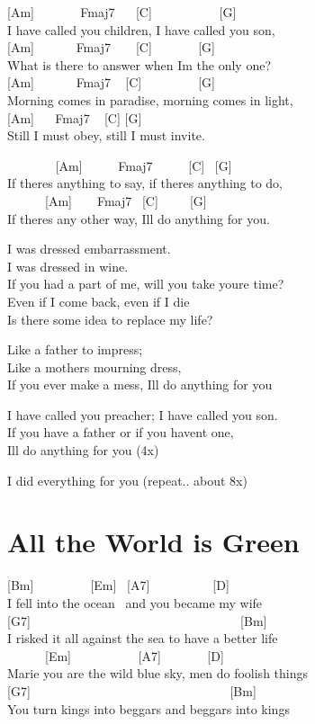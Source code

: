 \documentclass[
  letterpaper,
]{scrbook}
\begin{document}
{[}Am{]} ~ ~ ~ ~ Fmaj7 ~ ~{[}C{]} ~ ~ ~ ~ ~ ~ {[}G{]}\\
I have called you children, I have called you son,\\
{[}Am{]} ~ ~ ~ ~Fmaj7 ~ ~ {[}C{]} ~ ~ ~ ~ {[}G{]}\\
What is there to answer when I\textquotesingle m the only one?\\
{[}Am{]} ~ ~ ~ ~Fmaj7 ~ {[}C{]} ~ ~ ~ ~ ~ {[}G{]}\\
Morning comes in paradise, morning comes in light,\\
{[}Am{]} ~ ~Fmaj7 ~ {[}C{]} {[}G{]}\\
Still I must obey, still I must invite.

~ ~ ~ ~ ~{[}Am{]} ~ ~ ~ Fmaj7 ~ ~ ~ {[}C{]} ~{[}G{]}\\
If there\textquotesingle s anything to say, if there\textquotesingle s
anything to do,\\
\hspace*{0.333em} ~ ~ ~ ~{[}Am{]} ~ ~ Fmaj7 ~{[}C{]} ~ ~ ~{[}G{]}\\
If there\textquotesingle s any other way, I\textquotesingle ll do
anything for you.

I was dressed embarrassment.\\
I was dressed in wine.\\
If you had a part of me, will you take you\textquotesingle re time?\\
Even if I come back, even if I die\\
Is there some idea to replace my life?

Like a father to impress;\\
Like a mother\textquotesingle s mourning dress,\\
If you ever make a mess, I\textquotesingle ll do anything for you

I have called you preacher; I have called you son.\\
If you have a father or if you haven\textquotesingle t one,\\
I\textquotesingle ll do anything for you (4x)

I did everything for you (repeat.. about 8x)

\hypertarget{all-the-world-is-green}{%
\chapter{All the World is Green}\label{all-the-world-is-green}}

{[}Bm{]} ~ ~ ~ ~ ~ {[}Em{]} ~{[}A7{]} ~ ~ ~ ~ ~ ~{[}D{]}\\
I fell into the ocean ~and you became my wife\\
{[}G7{]} ~ ~ ~ ~ ~ ~ ~ ~ ~ ~ ~ ~ ~ ~ ~ ~ ~ ~ ~ ~{[}Bm{]}\\
I risked it all against the sea to have a better life\\
\hspace*{0.333em} ~ ~ ~ ~{[}Em{]} ~ ~ ~ ~ ~ ~ {[}A7{]} ~ ~ ~ ~ {[}D{]}\\
Marie you are the wild blue sky, men do foolish things\\
{[}G7{]} ~ ~ ~ ~ ~ ~ ~ ~ ~ ~ ~ ~ ~ ~ ~ ~ ~ ~ ~{[}Bm{]}\\
You turn kings into beggars and beggars into kings
\end{document}

